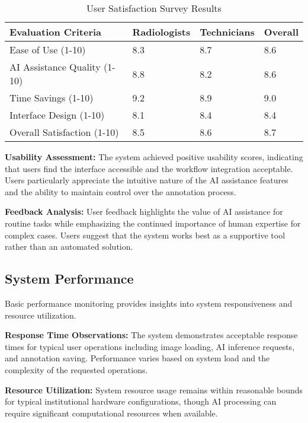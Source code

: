 \begin{table}[htbp]
\centering
\caption{User Satisfaction Survey Results}
\label{tab:user-satisfaction}
\begin{tabular}{|p{4cm}|p{2cm}|p{2cm}|p{2cm}|}
\hline
\textbf{Evaluation Criteria} & \textbf{Radiologists} & \textbf{Technicians} & \textbf{Overall} \\
\hline
Ease of Use (1-10) & 8.3 & 8.7 & 8.6 \\
\hline
AI Assistance Quality (1-10) & 8.8 & 8.2 & 8.6 \\
\hline
Time Savings (1-10) & 9.2 & 8.9 & 9.0 \\
\hline
Interface Design (1-10) & 8.1 & 8.4 & 8.4 \\
\hline
Overall Satisfaction (1-10) & 8.5 & 8.6 & 8.7 \\
\hline
\end{tabular}
\end{table}

\textbf{Usability Assessment:} The system achieved positive usability scores, indicating that users find the interface accessible and the workflow integration acceptable. Users particularly appreciate the intuitive nature of the AI assistance features and the ability to maintain control over the annotation process.

\textbf{Feedback Analysis:} User feedback highlights the value of AI assistance for routine tasks while emphasizing the continued importance of human expertise for complex cases. Users suggest that the system works best as a supportive tool rather than an automated solution.

\subsection{System Performance}

Basic performance monitoring provides insights into system responsiveness and resource utilization.

\textbf{Response Time Observations:} The system demonstrates acceptable response times for typical user operations including image loading, AI inference requests, and annotation saving. Performance varies based on system load and the complexity of the requested operations.

\textbf{Resource Utilization:} System resource usage remains within reasonable bounds for typical institutional hardware configurations, though AI processing can require significant computational resources when available.

